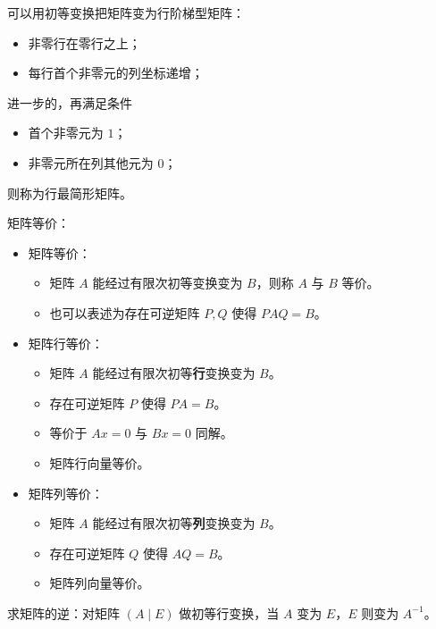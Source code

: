 可以用初等变换把矩阵变为行阶梯型矩阵：
\begin{itemize}
	\item 非零行在零行之上；
	\item 每行首个非零元的列坐标递增；
\end{itemize}
进一步的，再满足条件
\begin{itemize}
	\item 首个非零元为 $1$；
	\item 非零元所在列其他元为 $0$；
\end{itemize}
则称为行最简形矩阵。

矩阵等价：
\begin{itemize}
	\item 矩阵等价：
	      \begin{itemize}
		      \item 矩阵 $A$ 能经过有限次初等变换变为 $B$，则称 $A$ 与 $B$ 等价。
		      \item 也可以表述为存在可逆矩阵 $P,Q$ 使得 $PAQ = B$。
	      \end{itemize}
	\item 矩阵行等价：
	      \begin{itemize}
		      \item 矩阵 $A$ 能经过有限次初等\textbf{行}变换变为 $B$。
		      \item 存在可逆矩阵 $P$ 使得 $PA = B$。
		      \item 等价于 $Ax=0$ 与 $Bx=0$ 同解。
		      \item 矩阵行向量等价。
	      \end{itemize}
	\item 矩阵列等价：
	      \begin{itemize}
		      \item 矩阵 $A$ 能经过有限次初等\textbf{列}变换变为 $B$。
		      \item 存在可逆矩阵 $Q$ 使得 $AQ = B$。
		      \item 矩阵列向量等价。
	      \end{itemize}
\end{itemize}


求矩阵的逆：对矩阵 $(A \mid E)$ 做初等行变换，当 $A$ 变为 $E$，$E$ 则变为 $A^{-1}$。

